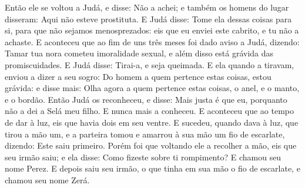 {{Então ele se voltou a Judá, e disse: Não a achei; e também os homens do lugar disseram: Aqui não esteve prostituta.
E Judá disse: Tome ela dessas coisas para si, para que não sejamos menosprezados: eis que eu enviei este cabrito, e tu não a achaste.
E aconteceu que ao fim de uns três meses foi dado aviso a Judá, dizendo: Tamar tua nora cometeu imoralidade sexual, e além disso está grávida das promiscuidades. E Judá disse: Tirai-a, e seja queimada.
E ela quando a tiravam, enviou a dizer a seu sogro: Do homem a quem pertence estas coisas, estou grávida: e disse mais: Olha agora a quem pertence estas coisas, o anel, e o manto, e o bordão.
Então Judá os reconheceu, e disse: Mais justa é que eu, porquanto não a dei a Selá meu filho. E nunca mais a conheceu.
E aconteceu que ao tempo de dar à luz, eis que havia dois em seu ventre.
E sucedeu, quando dava à luz, que tirou a mão um, e a parteira tomou e amarrou à sua mão um fio de escarlate, dizendo: Este saiu primeiro.
Porém foi que voltando ele a recolher a mão, eis que seu irmão saiu; e ela disse: Como fizeste sobre ti rompimento? E chamou seu nome Perez.
E depois saiu seu irmão, o que tinha em sua mão o fio de escarlate, e chamou seu nome Zerá.

\par}

}
